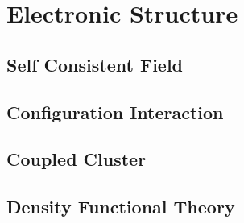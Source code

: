 \chapter{Electronic Structure}

\section{Self Consistent Field}
\section{Configuration Interaction}
\section{Coupled Cluster}
\section{Density Functional Theory}
